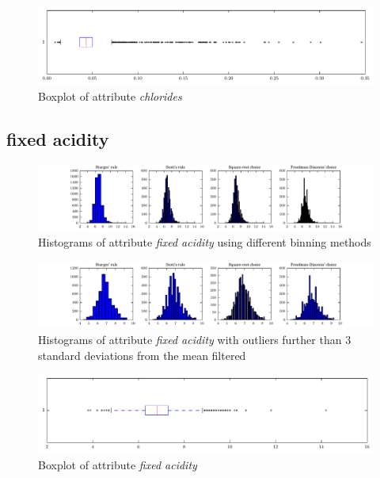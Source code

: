 \documentclass{report}
\begin{document}
\begin{figure}[H]
\includegraphics[width=\textwidth]{boxplots/chlorides.pdf}
\caption{Boxplot of attribute \emph{chlorides}}\end{figure}

\newpage\subsection{fixed acidity}
\begin{figure}[H]
\includegraphics[width=\textwidth]{histograms/fixed_acidity.pdf}
\caption{Histograms of attribute \emph{fixed acidity} using different binning methods}\end{figure}

\begin{figure}[H]
\includegraphics[width=\textwidth]{histograms/fixed_acidity_filtered.pdf}
\caption{Histograms of attribute \emph{fixed acidity} with outliers further than 3 standard deviations from the mean filtered}\n\end{figure}

\begin{figure}[H]
\includegraphics[width=\textwidth]{boxplots/fixed_acidity.pdf}
\caption{Boxplot of attribute \emph{fixed acidity}}\end{figure}
\end{document}
